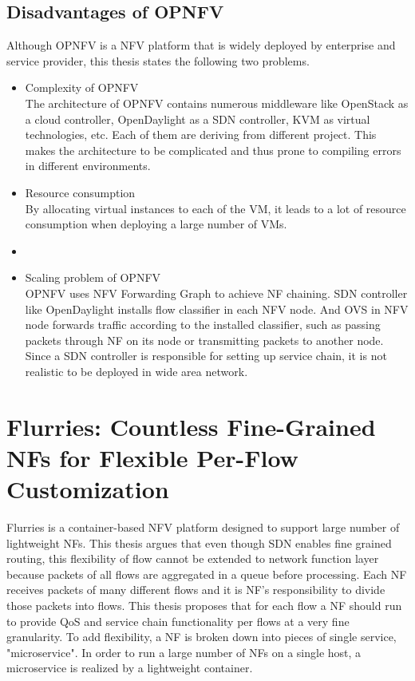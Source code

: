 \subsection{Disadvantages of OPNFV}
Although OPNFV is a NFV platform that is widely deployed by enterprise and service provider, this thesis states the following two problems.
\begin{itemize}
	\item Complexity of OPNFV \\
		The architecture of OPNFV contains numerous middleware like OpenStack as a cloud controller, OpenDaylight as a SDN controller, KVM as virtual technologies, etc. Each of them are deriving from different project. This makes the architecture to be complicated and thus prone to compiling errors in different environments. 
	\item Resource consumption \\
		By allocating virtual instances to each of the VM, it leads to a lot of resource consumption when deploying a large number of VMs. 
	\item 
	\item Scaling problem of OPNFV \\
		OPNFV uses NFV Forwarding Graph to achieve NF chaining. SDN controller like OpenDaylight installs flow classifier in each NFV node. And OVS in NFV node forwards traffic according to the installed classifier, such as passing packets through NF on its node or transmitting packets to another node. Since a SDN controller is responsible for setting up service chain, it is not realistic to be deployed in wide area network. 
\end{itemize}

\section{Flurries: Countless Fine-Grained NFs for Flexible Per-Flow Customization} 
Flurries\cite{Flurries} is a container-based NFV platform designed to support large number of lightweight NFs. This thesis argues that even though SDN enables fine grained routing, this flexibility of flow cannot be extended to network function layer because packets of all flows are aggregated in a queue before processing. Each NF receives packets of many different flows and it is NF's responsibility to divide those packets into flows. This thesis proposes that for each flow a NF should run to provide QoS and service chain functionality per flows at a very fine granularity. To add flexibility, a NF is broken down into pieces of single service, "microservice". In order to run a large number of NFs on a single host, a microservice is realized by a lightweight container. 

